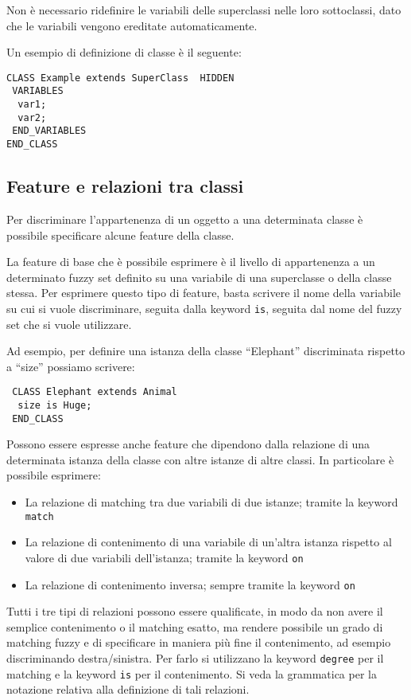 Non è necessario ridefinire le variabili delle superclassi nelle loro sottoclassi, dato che le variabili vengono ereditate automaticamente.

Un esempio di definizione di classe è il seguente:

\begin{verbatim}
CLASS Example extends SuperClass  HIDDEN
 VARIABLES
  var1;
  var2;
 END_VARIABLES
END_CLASS
\end{verbatim}


\subsection{Feature e relazioni tra classi}

Per discriminare l'appartenenza di un oggetto a una determinata classe è possibile specificare alcune feature della classe.

La feature di base che è possibile esprimere è il livello di appartenenza a un determinato fuzzy set definito su una variabile di una superclasse o della classe stessa. 
Per esprimere questo tipo di feature, basta scrivere il nome della variabile su cui si vuole discriminare, seguita dalla keyword \verb|is|, seguita dal nome del fuzzy set che si vuole utilizzare.

Ad esempio, per definire una istanza della classe ``Elephant'' discriminata rispetto a ``size'' possiamo scrivere:

\begin{verbatim}
 CLASS Elephant extends Animal
  size is Huge;
 END_CLASS
\end{verbatim}


Possono essere espresse anche feature che dipendono dalla relazione di una determinata istanza della classe con altre istanze di altre classi.
In particolare è possibile esprimere:

\begin{itemize}
 \item La relazione di matching tra due variabili di due istanze; tramite la keyword \verb|match|
 \item La relazione di contenimento di una variabile di un'altra istanza rispetto al valore di due variabili dell'istanza; tramite la keyword \verb|on|
 \item La relazione di contenimento inversa; sempre tramite la keyword \verb|on|
\end{itemize}

Tutti i tre tipi di relazioni possono essere qualificate, in modo da non avere il semplice contenimento o il matching esatto, ma rendere possibile un grado di matching fuzzy e di specificare in maniera più fine il contenimento, ad esempio discriminando destra/sinistra. Per farlo si utilizzano la keyword \verb|degree| per il matching e la keyword \verb|is| per il contenimento. Si veda la grammatica per la notazione relativa alla definizione di tali relazioni.

